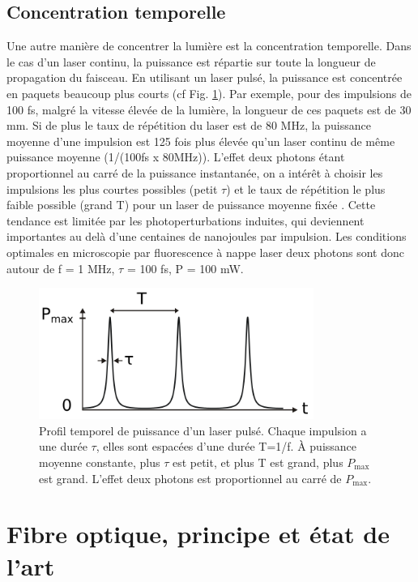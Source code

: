 \subsection{Concentration temporelle}

Une autre manière de concentrer la lumière est la concentration temporelle. Dans le cas d'un laser continu, la puissance est répartie sur toute la longueur de propagation du faisceau. En utilisant un laser pulsé, la puissance est concentrée en paquets beaucoup plus courts (cf Fig. \ref{pulsed-laser}). Par exemple, pour des impulsions de 100 fs, malgré la vitesse élevée de la lumière, la longueur de ces paquets est de 30 mm. Si de plus le taux de répétition du laser est de 80 MHz, la puissance moyenne d'une impulsion est 125 fois plus élevée qu'un laser continu de même puissance moyenne (1/(100fs x 80MHz)). L'effet deux photons étant proportionnel au carré de la puissance instantanée, on a intérêt à choisir les impulsions les plus courtes possibles (petit $\tau$) et le taux de répétition le plus faible possible (grand T) pour un laser de puissance moyenne fixée \cite{maioli_fast_2020}. Cette tendance est limitée par les photoperturbations induites, qui deviennent importantes au delà d'une centaines de nanojoules par impulsion. Les conditions optimales en microscopie par fluorescence à nappe laser deux photons sont donc autour de f = 1 MHz, $\tau$ = 100 fs, P = 100 mW.

\begin{figure}
\centering
\includegraphics[width=0.8\textwidth]{./files/pulsed_laser.svg.png}
\caption{Profil temporel de puissance d'un laser pulsé. Chaque impulsion a une durée $\tau$, elles sont espacées d'une durée T=1/f. À puissance moyenne constante, plus $\tau$ est petit, et plus T est grand, plus $P_\text{max}$ est grand. L'effet deux photons est proportionnel au carré de $P_\text{max}$.
}
\label{pulsed-laser}
\end{figure}


\section{Fibre optique, principe et état de l'art}


